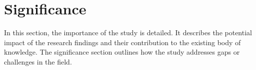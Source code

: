 \section{Significance}
	In this section, the importance of the study is detailed. It describes the potential impact of the research findings and their contribution to the existing body of knowledge. The significance section outlines how the study addresses gaps or challenges in the field.